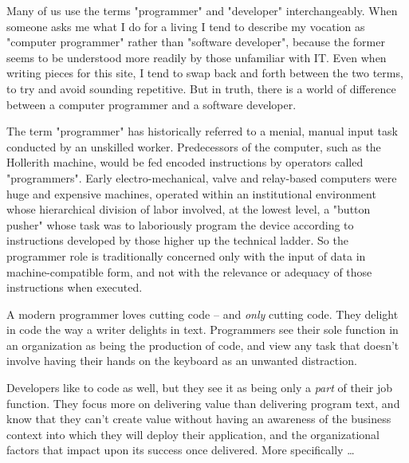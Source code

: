\documentclass{article}
\begin{document}
Many of us use the terms "programmer" and "developer" interchangeably.
When someone asks me what I do for a living I tend to describe my
vocation as "computer programmer" rather than "software developer",
because the former seems to be understood more readily by those
unfamiliar with IT. Even when writing pieces for this site, I tend to
swap back and forth between the two terms, to try and avoid sounding
repetitive. But in truth, there is a world of difference between a
computer programmer and a software developer.

The term "programmer" has historically referred to a menial, manual
input task conducted by an unskilled worker. Predecessors of the
computer, such as the Hollerith machine, would be fed encoded
instructions by operators called "programmers". Early
electro-mechanical, valve and relay-based computers were huge and
expensive machines, operated within an institutional environment whose
hierarchical division of labor involved, at the lowest level, a "button
pusher" whose task was to laboriously program the device according to
instructions developed by those higher up the technical ladder. So the
programmer role is traditionally concerned only with the input of data
in machine-compatible form, and not with the relevance or adequacy of
those instructions when executed.

A modern programmer loves cutting code -- and \emph{only} cutting code. They
delight in code the way a writer delights in text. Programmers see their
sole function in an organization as being the production of code, and
view any task that doesn't involve having their hands on the keyboard as
an unwanted distraction.

Developers like to code as well, but they see it as being only a \emph{part}
of their job function. They focus more on delivering value than
delivering program text, and know that they can't create value without
having an awareness of the business context into which they will deploy
their application, and the organizational factors that impact upon its
success once delivered. More specifically \ldots{}
\end{document}
